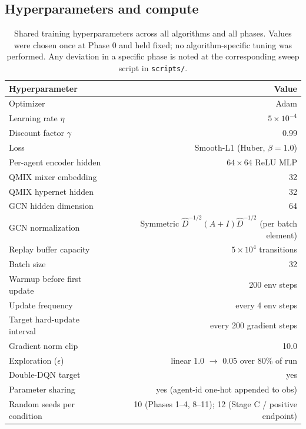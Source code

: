 \begin{appendices}
\section{Hyperparameters and compute}
\label{app:hparams}

\begin{table}[!ht]
  \centering
  \footnotesize
  \caption{Shared training hyperparameters across all algorithms and
  all phases. Values were chosen once at Phase 0 and held fixed; no
  algorithm-specific tuning was performed. Any deviation in a specific
  phase is noted at the corresponding sweep script in \texttt{scripts/}.}
  \label{tab:hparams_shared}
  \begin{tabular}{lr}
    \toprule
    Hyperparameter & Value \\
    \midrule
    Optimizer                    & Adam \\
    Learning rate $\eta$         & $5 \times 10^{-4}$ \\
    Discount factor $\gamma$     & 0.99 \\
    Loss                         & Smooth-L1 (Huber, $\beta=1.0$) \\
    Per-agent encoder hidden     & $64 \times 64$ ReLU MLP \\
    QMIX mixer embedding         & 32 \\
    QMIX hypernet hidden         & 32 \\
    GCN hidden dimension         & 64 \\
    GCN normalization            & Symmetric $\hat D^{-1/2}(A+I)\hat D^{-1/2}$ (per batch element) \\
    Replay buffer capacity       & $5 \times 10^4$ transitions \\
    Batch size                   & 32 \\
    Warmup before first update   & 200 env steps \\
    Update frequency             & every 4 env steps \\
    Target hard-update interval  & every 200 gradient steps \\
    Gradient norm clip           & 10.0 \\
    Exploration ($\epsilon$)     & linear 1.0 $\rightarrow$ 0.05 over 80\% of run \\
    Double-DQN target            & yes \\
    Parameter sharing            & yes (agent-id one-hot appended to obs) \\
    Random seeds per condition   & 10 (Phases 1--4, 8--11); 12 (Stage C / positive endpoint) \\
    \bottomrule
  \end{tabular}
\end{table}


\end{appendices}
